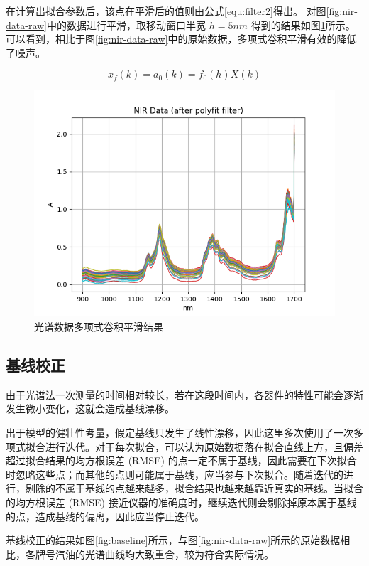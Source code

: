 \documentclass[a4paper, 12pt]{article}
\begin{document}
			在计算出拟合参数后，该点在平滑后的值则由公式\eqref{equ:filter2}得出。
			对图\ref{fig:nir-data-raw}中的数据进行平滑，取移动窗口半宽 $h = 5nm$ 得到的结果如图\ref{fig:filter}所示。
			可以看到，相比于图\ref{fig:nir-data-raw}中的原始数据，多项式卷积平滑有效的降低了噪声。
			
			\begin{equation}\label{equ:filter2}
				x_f(k) = a_0(k) = f_0(h)X(k)
			\end{equation}
			
			\begin{figure}
				\centering
				\includegraphics[width=0.8\linewidth]{../img/filter}
				\caption{光谱数据多项式卷积平滑结果}
				\label{fig:filter}
			\end{figure}
			
		\subsection{基线校正}
			由于光谱法一次测量的时间相对较长，若在这段时间内，各器件的特性可能会逐渐发生微小变化，这就会造成基线漂移。
			
			出于模型的健壮性考量，假定基线只发生了线性漂移，因此这里多次使用了一次多项式拟合进行迭代。对于每次拟合，可以认为原始数据落在拟合直线上方，且偏差超过拟合结果的均方根误差 (RMSE) 的点一定不属于基线，因此需要在下次拟合时忽略这些点；而其他的点则可能属于基线，应当参与下次拟合。随着迭代的进行，剔除的不属于基线的点越来越多，拟合结果也越来越靠近真实的基线。当拟合的均方根误差 (RMSE) 接近仪器的准确度时，继续迭代则会剔除掉原本属于基线的点，造成基线的偏离，因此应当停止迭代。
			
			基线校正的结果如图\ref{fig:baseline}所示，与图\ref{fig:nir-data-raw}所示的原始数据相比，各牌号汽油的光谱曲线均大致重合，较为符合实际情况。
			
\end{document}
